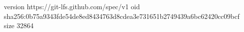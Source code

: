 version https://git-lfs.github.com/spec/v1
oid sha256:0b75a9343fde54de8ed8434763d8cdea3e731651b2749439a6bc62420cc09bcf
size 32864
